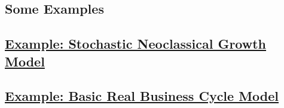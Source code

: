\subsection{Some Examples}
\subsection*{\hyperref[example:StochasticNeoclassicalGrowth]{Example: Stochastic Neoclassical Growth Model}}
\subsection*{\hyperref[example:BasicRBC]{Example: Basic Real Business Cycle Model}}


